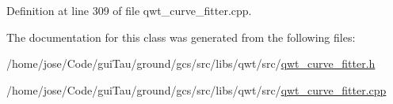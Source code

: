 Definition at line 309 of file qwt\-\_\-curve\-\_\-fitter.\-cpp.



The documentation for this class was generated from the following files\-:\begin{DoxyCompactItemize}
\item 
/home/jose/\-Code/gui\-Tau/ground/gcs/src/libs/qwt/src/\hyperlink{qwt__curve__fitter_8h}{qwt\-\_\-curve\-\_\-fitter.\-h}\item 
/home/jose/\-Code/gui\-Tau/ground/gcs/src/libs/qwt/src/\hyperlink{qwt__curve__fitter_8cpp}{qwt\-\_\-curve\-\_\-fitter.\-cpp}\end{DoxyCompactItemize}
